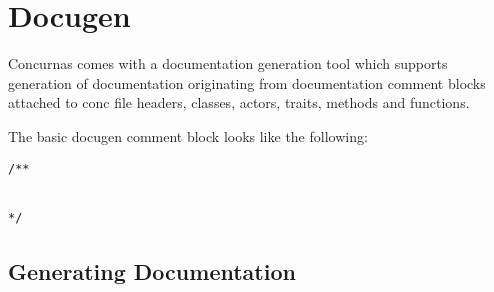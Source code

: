 \documentclass[index]{subfiles}
\begin{document}
	\chapter[Docugen]{Docugen}

Concurnas comes with a documentation generation tool which supports generation of documentation originating from documentation comment blocks attached to conc file headers, classes, actors, traits, methods and functions.

The basic docugen comment block looks like the following:
\begin{lstlisting}
/**


*/
\end{lstlisting}

\section{Generating Documentation}
\end{document}
